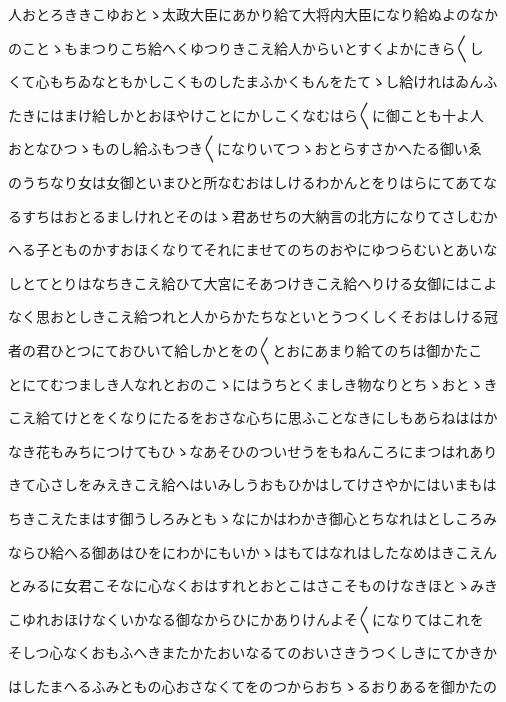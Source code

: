 \documentclass[a4paper,11pt,landscape]{ltjtarticle}
\begin{document}
\par\medskip
人おとろききこゆおとゝ太政大臣にあかり給て大将内大臣になり給ぬよのなか
\par\medskip
のことゝもまつりこち給へくゆつりきこえ給人からいとすくよかにきら〱し
\par\medskip
くて心もちゐなともかしこくものしたまふかくもんをたてゝし給けれはゐんふ
\par\medskip
たきにはまけ給しかとおほやけことにかしこくなむはら〱に御ことも十よ人
\par\medskip
おとなひつゝものし給ふもつき〱になりいてつゝおとらすさかへたる御いゑ
\par\medskip
のうちなり女は女御といまひと所なむおはしけるわかんとをりはらにてあてな
\par\medskip
るすちはおとるましけれとそのはゝ君あせちの大納言の北方になりてさしむか
\par\medskip
へる子とものかすおほくなりてそれにませてのちのおやにゆつらむいとあいな
\par\medskip
しとてとりはなちきこえ給ひて大宮にそあつけきこえ給へりける女御にはこよ
\par\medskip
なく思おとしきこえ給つれと人からかたちなといとうつくしくそおはしける冠
\par\medskip
者の君ひとつにておひいて給しかとをの〱とおにあまり給てのちは御かたこ
\par\medskip
とにてむつましき人なれとおのこゝにはうちとくましき物なりとちゝおとゝき
\par\medskip
こえ給てけとをくなりにたるをおさな心ちに思ふことなきにしもあらねははか
\par\medskip
なき花もみちにつけてもひゝなあそひのついせうをもねんころにまつはれあり
\par\medskip
きて心さしをみえきこえ給へはいみしうおもひかはしてけさやかにはいまもは
\par\medskip
ちきこえたまはす御うしろみともゝなにかはわかき御心とちなれはとしころみ
\par\medskip
ならひ給へる御あはひをにわかにもいかゝはもてはなれはしたなめはきこえん
\par\medskip
とみるに女君こそなに心なくおはすれとおとこはさこそものけなきほとゝみき
\par\medskip
こゆれおほけなくいかなる御なからひにかありけんよそ〱になりてはこれを
\par\medskip
そしつ心なくおもふへきまたかたおいなるてのおいさきうつくしきにてかきか
\par\medskip
はしたまへるふみともの心おさなくてをのつからおちゝるおりあるを御かたの
\par\medskip
\end{document}
